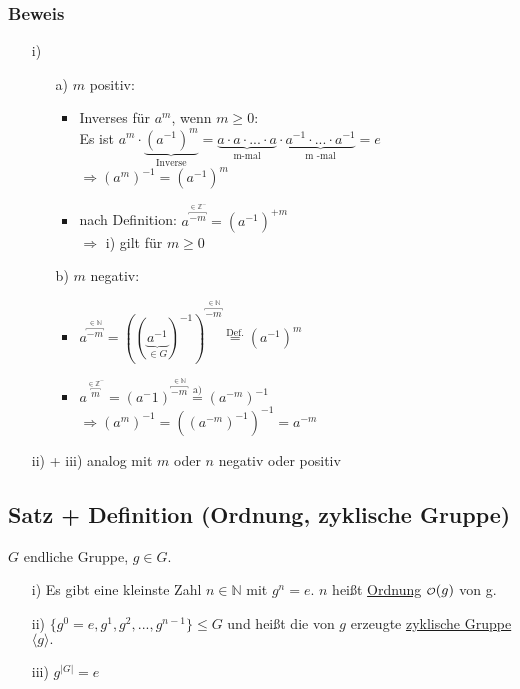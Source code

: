 \documentclass[12pt,titlepage, pdf]{article}
\newcommand\smallO{
	\mathchoice
	{{\scriptstyle\mathcal{O}}}%
	{{\scriptstyle\mathcal{O}}}%
	{{\scriptscriptstyle\mathcal{O}}}%
	{\scalebox{.7}{$\scriptscriptstyle\mathcal{O}$}}%
}
\newcommand{\uline}[1]{\underline{#1}}
\renewcommand{\>}{\rightarrow}
\renewcommand{\*}{\cdot}
\begin{document}
\subsubsection*{Beweis}
\begin{itemize}
	\item[i)] 
	\begin{itemize}
		\item[a)] $m$ positiv:
		\begin{itemize}
			\item Inverses für $a^m$, wenn $m \geq 0:$ \\
			Es ist $a^m  \cdot \underbrace{(a^{-1})^m}_{\text{Inverse}} = \underbrace{a \cdot a \cdot ... \cdot a}_{\text{m-mal}} \cdot \underbrace{ a^{-1} \cdot ... \cdot a^{-1}}_{\text{m -mal}} = e$ \\
			$\Rightarrow (a^m)^{-1}= (a^{-1})^m$
			\item nach Definition: $a^{\overbracket{-m}^{\in \mathbb{Z^-}}} = (a^{-1})^{+m}$ \\
			$\Rightarrow$ i) gilt für $m \geq 0$
		\end{itemize}
		\item[b)] $m$ negativ:
		\begin{itemize}
			\item $a^{\overbracket{-m}^{ \in \mathbb{N}}} = ((\underbrace{a^{-1}}_{\in G})^{-1})^{\overbracket{-m}^{ \in \mathbb{N}}} \overset{\textrm{Def.}}{=} (a^{-1})^m$
			\item $a^{\overbracket{m}^{ \in \mathbb{Z}^-}} = (a^-1)^{\overbracket{-m}^{ \in \mathbb{N}}} \overset{\textrm{a)}}{=} (a^{-m})^{-1}$\\$ \Rightarrow (a^m)^{-1} = ((a^{-m})^{-1})^{-1} = a^{-m}$
		\end{itemize}	
	\end{itemize}
	\item[ii) + iii)] analog mit $m$ oder $n$ negativ oder positiv 
\end{itemize}
\subsection{Satz + Definition (Ordnung, zyklische Gruppe)}
$G$ endliche Gruppe, $g \in G$. 
\begin{itemize}
	\item[i)] Es gibt eine kleinste Zahl $n \in \mathbb{N}$ mit $g^n = e$.
	$n$ heißt \uline{Ordnung} $\smallO(g)$ von g.
	\item[ii)] $\{g^0 = e, g^1, g^2,...,g^{n-1}\} \leq G$ und heißt die von $g$ erzeugte \uline{zyklische Gruppe} $\langle g \rangle.$
	\item[iii)] $g^{|G|} = e$
\end{itemize}
\end{document}
